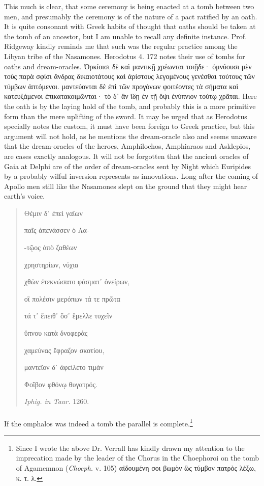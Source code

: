 \documentclass[a4paper, 11pt, oneside, polutonikogreek, english]{article}
\begin{document}
This much is clear, that some ceremony is being enacted at a tomb between two men, and presumably the ceremony is of the nature of a pact ratified by an oath. It is quite consonant with Greek habits of thought that oaths should be taken at the tomb of an ancestor, but I am unable to recall any definite instance. Prof. Ridgeway kindly reminds me that such was the regular practice among the Libyan tribe of the Nasamones. Herodotus 4. 172 notes their use of tombs for oaths and dream-oracles. Ὁρκίοισι δὲ καὶ μαντικῇ χρέωνται τοιῇδε· ὀμνύουσι μὲν τοὺς παρὰ σφίσι ἄνδρας δικαιοτάτους καὶ ἀρίστους λεγομένους γενέσθαι τούτους τῶν τύμβων ἁπτόμενοι. μαντεύονται δὲ ἐπὶ τῶν προγόνων φοιτέοντες τὰ σήματα καὶ κατευξάμενοι ἐπικατακοιμῶνται· τὸ δ᾽ ἂν ἴδῃ ἐν τῇ ὄψι ἐνύπνιον τούτῳ χρᾶται. Here the oath is by the laying hold of the tomb, and probably this is a more primitive form than the mere uplifting of the sword. It may be urged that as Herodotus specially notes the custom, it must have been foreign to Greek practice, but this argument will not hold, as he mentions the dream-oracle also and seems unaware that the dream-oracles of the heroes, Amphilochos, Amphiaraos and Asklepios, are cases exactly analogous. It will not be forgotten that the ancient oracles of Gaia at Delphi are of the order of dream-oracles sent by Night which Euripides by a probably wilful inversion represents as innovations. Long after the coming of Apollo men still like the Nasamones slept on the ground that they might hear earth's voice.
\begin{quotation}
Θέμιν δ᾽ ἐπεὶ γαΐων

παῖς ἀπενάσσεν ὁ Λα-

-τῷος ἀπὸ ζαθέων

χρηστηρίων, νύχια

χθὼν ἐτεκνώσατο φάσματ᾽ ὀνείρων,

οἳ πολέσιν μερόπων τά τε πρῶτα

τά τ᾽ ἔπειθ᾽ ὅσ᾽ ἔμελλε τυχεῖν

ὕπνου κατὰ δνοφερὰς

χαμεύνας ἔφραζον σκοτίου,

μαντεῖον δ᾽ ἀφείλετο τιμὰν

Φοῖβον φθόνῳ θυγατρός.

\hspace*{20mm}\emph{Iphig. in Taur.} 1260.
\end{quotation}
\paragraph{}
If the omphalos was indeed a tomb the parallel is complete.\footnote{Since I wrote the above Dr. Verrall has kindly drawn my attention to the imprecation made by the leader of the Chorus in the Choephoroi on the tomb of Agamemnon (\emph{Choeph.} v. 105) αἰδουμένη σοι βωμὸν ὣς τύμβον πατρὸς λέξω, κ. τ. λ.}
\end{document}
